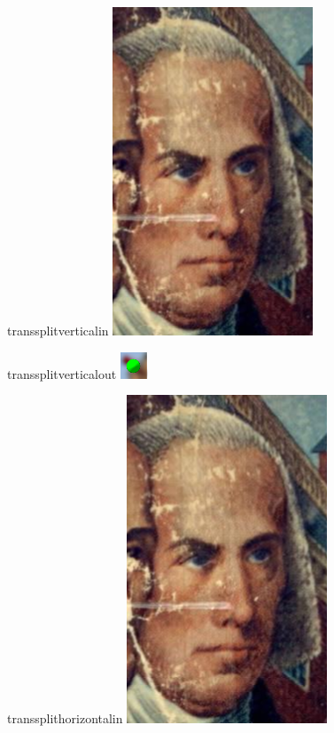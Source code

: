 \documentclass{beamer}
\begin{document}
\begin{frame}{transsplitverticalin}
    \transsplitverticalin
    \includegraphics{a.png}
\end{frame}

\begin{frame}{transsplitverticalout}
    \transsplitverticalout
    \includegraphics{b.png}
\end{frame}

\begin{frame}{transsplithorizontalin}
    \transsplithorizontalin
    \includegraphics{a.png}
\end{frame}
\end{document}
